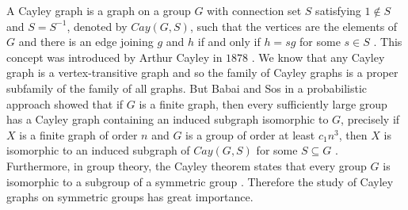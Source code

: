 \documentclass[11pt,letterpaper]{article}
\begin{document}
{A Cayley graph is a graph on a group $G$ with connection set $S$ satisfying $1 \notin S$ and $S=S^{-1}$,  denoted by $Cay(G,S)$, such that the vertices are the elements of $G$ and there is an edge joining $g$ and $h$ if and only if $h = sg$ for some $s \in S$ \cite{beineke2004topics}. This concept was introduced by Arthur Cayley in $1878$ \cite{cayley1854vii}. We know that any Cayley graph is a vertex-transitive graph and so the family of Cayley graphs is a proper subfamily of the family of all graphs. But Babai and Sos in a probabilistic approach showed that if $G$ is a finite graph, then every sufficiently large group has a Cayley graph containing an induced subgraph isomorphic to $G$, precisely if $X$ is a finite graph of order $n$ and $G$ is a group of order at least $c_1 n^3$, then $X$ is isomorphic to an induced subgraph of $Cay(G,S)$ for some $S\subseteq G$ \cite{babai1985sidon}. Furthermore, in group theory, the Cayley theorem states that every group $G$ is isomorphic to a subgroup of a symmetric group \cite{cayley1854vii}. Therefore the study of Cayley graphs on symmetric groups has great importance.

}
\end{document}
